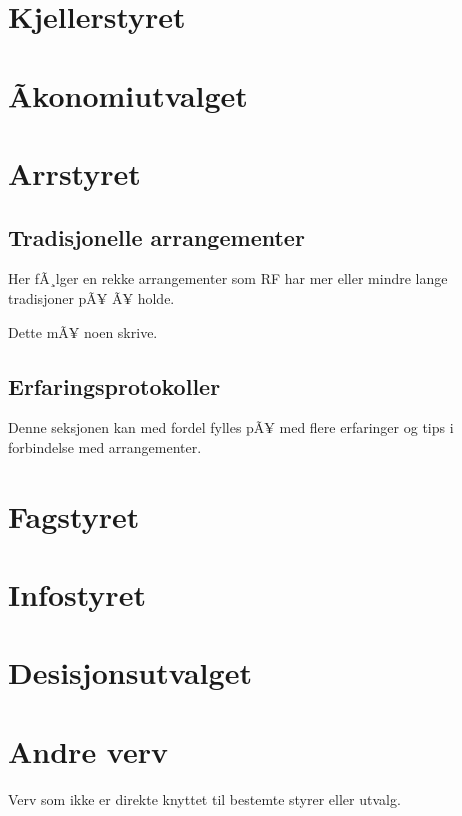 \documentclass[11pt,norsk,a4paper,pointlessnumbers]{scrbook}
\begin{document}
\chapter{Kjellerstyret}




\chapter{Ãkonomiutvalget}


\chapter{Arrstyret}

\section{Tradisjonelle arrangementer}
Her fÃ¸lger en rekke arrangementer som RF har mer eller mindre lange
tradisjoner pÃ¥ Ã¥ holde.

Dette mÃ¥ noen skrive.
%
%
%
%
%
%

\section{Erfaringsprotokoller}
Denne seksjonen kan med fordel fylles pÃ¥ med flere erfaringer og tips
i forbindelse med arrangementer.



\chapter{Fagstyret}


\chapter{Infostyret}



\chapter{Desisjonsutvalget}


\chapter{Andre verv}
Verv som ikke er direkte knyttet til bestemte styrer eller utvalg.


\end{document}
